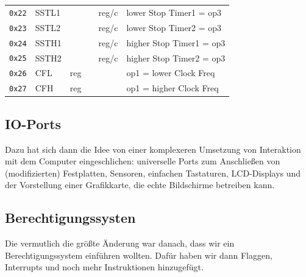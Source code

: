 \documentclass{scrartcl}
\begin{document}
\begin{center}
\begin{table}
\begin{tabular}{l | l l l l | l}
                \texttt{0x22} & SSTL1 & & & reg/c & lower Stop Timer1 = op3 \\
                \texttt{0x23} & SSTL2 & & & reg/c & lower Stop Timer2 = op3 \\
                \texttt{0x24} & SSTH1 & & & reg/c & higher Stop Timer1 = op3 \\
                \texttt{0x25} & SSTH2 & & & reg/c & higher Stop Timer2 = op3 \\
                \texttt{0x26} & CFL  & reg & & & op1 = lower Clock Freq \\
                \texttt{0x27} & CFH  & reg & & & op1 = higher Clock Freq \\
                \hline
            \end{tabular}
        \end{table}
    \end{center}

    \newpage
    \subsection{IO-Ports}
    Dazu hat sich dann die Idee von einer komplexeren Umsetzung von Interaktion mit dem Computer eingeschlichen:
    universelle Ports zum Anschließen von (modifizierten) Festplatten, Sensoren, einfachen Tastaturen, LCD-Displays und der Vorstellung einer Grafikkarte, die echte Bildschirme betreiben kann.

        \vspace{-5pt}

    \subsection{Berechtigungssysten}
    Die vermutlich die größte Änderung war danach, dass wir ein Berechtigungssystem einführen wollten.
    Dafür haben wir dann Flaggen, Interrupts und noch mehr Instruktionen hinzugefügt.
\end{document}
